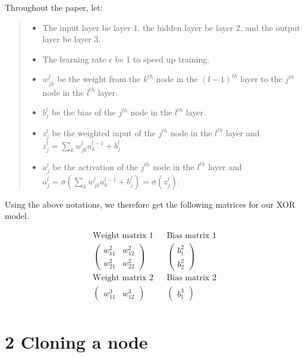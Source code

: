 \documentclass[12pt,english,]{article}
\newcommand{\mtx}[1]{\begin{pmatrix}#1\end{pmatrix}} %
\begin{document}
Throughout the paper, let:

\vspace{-2truemm}

\begin{quote}
\begin{itemize}
\item The input layer be layer 1, the hidden layer be layer 2, and the output layer be layer 3.
\item The learning rate $\epsilon$ be 1 to speed up training.
\item $w_{jk}^{l}$ be the weight from the $k^{th}$ node in the $(l-1)^{th}$ layer to the $j^{th}$ node in the $l^{th}$ layer.
\item $b_{j}^l$ be the bias of the $j^{th}$ node in the $l^{th}$ layer.
\item $z_{j}^l$ be the weighted input of the $j^{th}$ node in the $l^{th}$ layer and\\ $z_{j}^{l} =\sum_{k}w_{jk}^{l}a_{k}^{l-1} + b_{j}^l$
\item $a_{j}^l$ be the activation of the $j^{th}$ node in the $l^{th}$ layer and\\ $a_{j}^{l} =\sigma(\sum_{k}w_{jk}^{l}a_{k}^{l-1} + b_{j}^l)= \sigma(z_{j}^{l})$.
\end{itemize}
\end{quote}

\vspace{-2truemm}

\newpage

Using the above notations, we therefore get the following matrices for our XOR model.

\begin{align*}
\text{Weight matrix 1} &&\text{Bias matrix 1} \\
\mtx{w_{11}^2 & w_{12}^2\\  w_{21}^2 & w_{22}^2} &&\mtx{b_{1}^2 \\ b_{2}^2 }\\
\text{Weight matrix 2} &&\text{Bias matrix 2}\\
\mtx{w_{11}^3 & w_{12}^3} &&\mtx{b_{1}^3}\\
\end{align*}

\hypertarget{section2}{%
\section{\texorpdfstring{2 \enspace Cloning a node}{2 Cloning a node}}\label{section2}}
\end{document}
